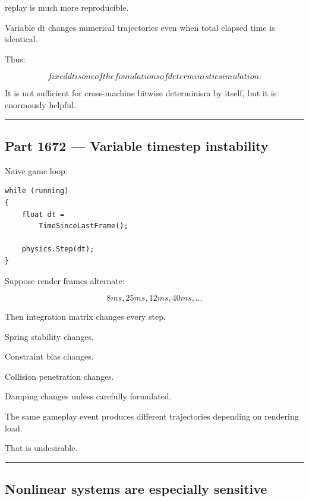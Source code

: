 replay is much more reproducible.

Variable dt changes numerical trajectories even when total elapsed time is identical.

Thus:

\[
\boxed{
fixed dt is one of the foundations of deterministic simulation.
}
\]

It is not sufficient for cross-machine bitwise determinism by itself, but it is enormously helpful.

\begin{center}\rule{0.5\linewidth}{0.5pt}\end{center}

\subsection{Part 1672 --- Variable timestep instability}\label{06-engine-ii-ch037-part-1672-variable-timestep-instability}

\hypertarget{06-engine-ii-ch037-part-1672-variable-timestep-instability}{}

Naive game loop:

\begin{verbatim}
while (running)
{
    float dt =
        TimeSinceLastFrame();

    physics.Step(dt);
}
\end{verbatim}

Suppose render frames alternate:

\[
8ms,25ms,12ms,40ms,\dots
\]

Then integration matrix changes every step.

Spring stability changes.

Constraint bias changes.

Collision penetration changes.

Damping changes unless carefully formulated.

The same gameplay event produces different trajectories depending on rendering load.

That is undesirable.

\begin{center}\rule{0.5\linewidth}{0.5pt}\end{center}

\subsection{Nonlinear systems are especially sensitive}\label{06-engine-ii-ch037-nonlinear-systems-are-especially-sensitive}

